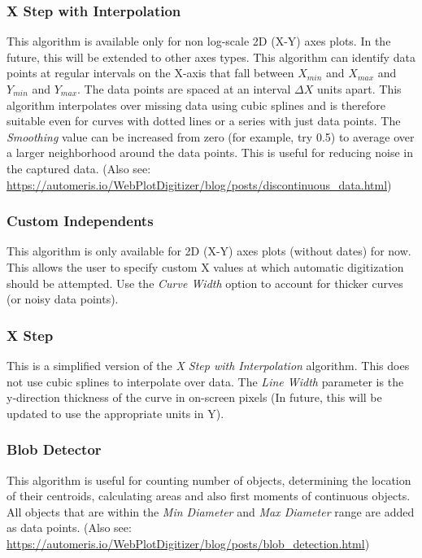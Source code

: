 \documentclass[letterpaper, 11pt]{article}
\begin{document}
\subsubsection{X Step with Interpolation}
This algorithm is available only for non log-scale 2D (X-Y) axes plots. In the future, this will be extended to other axes types. This algorithm can identify data points at regular intervals on the X-axis that fall between $X_{min}$ and $X_{max}$ and $Y_{min}$ and $Y_{max}$. The data points are spaced at an interval $\Delta X$ units apart. This algorithm interpolates over missing data using cubic splines and is therefore suitable even for curves with dotted lines or a series with just data points. The \emph{Smoothing} value can be increased from zero (for example, try 0.5) to average over a larger neighborhood around the data points. This is useful for reducing noise in the captured data. (Also see: \url{https://automeris.io/WebPlotDigitizer/blog/posts/discontinuous_data.html})

\subsubsection{Custom Independents}
This algorithm is only available for 2D (X-Y) axes plots (without dates) for now. This allows the user to specify custom X values at which automatic digitization should be attempted. Use the \emph{Curve Width} option to account for thicker curves (or noisy data points).

\subsubsection{X Step}
This is a simplified version of the \emph{X Step with Interpolation} algorithm. This does not use cubic splines to interpolate over data. The \emph{Line Width} parameter is the y-direction thickness of the curve in on-screen pixels (In future, this will be updated to use the appropriate units in Y). 

\subsubsection{Blob Detector}
This algorithm is useful for counting number of objects, determining the location of their centroids, calculating areas and also first moments of continuous objects. All objects that are within the \emph{Min Diameter} and \emph{Max Diameter} range are added as data points. (Also see: \url{https://automeris.io/WebPlotDigitizer/blog/posts/blob_detection.html})
\end{document}
